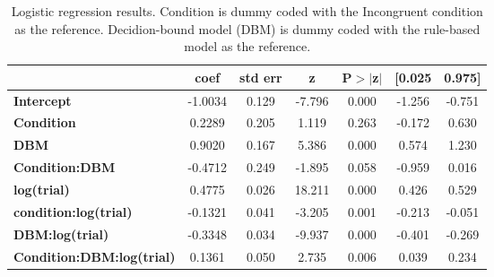 \documentclass[doc, floatsintext]{apa7}
\begin{document}
\begin{table}
\begin{center}
\caption{Logistic regression results. Condition is dummy
    coded with the Incongruent condition as the reference.
    Decidion-bound model (DBM) is dummy coded with the
    rule-based model as the reference.
}
\label{tab_logistic_regression}
\begin{tabular}{lcccccc}
  & \textbf{coef} & \textbf{std err} & \textbf{z} & \textbf{P$> |$z$|$} & \textbf{[0.025} & \textbf{0.975]}  \\
\midrule
\textbf{Intercept}                            &      -1.0034  &        0.129     &    -7.796  &         0.000        &       -1.256    &       -0.751     \\
\textbf{Condition}                            &       0.2289  &        0.205     &     1.119  &         0.263        &       -0.172    &        0.630     \\
\textbf{DBM}                                  &       0.9020  &        0.167     &     5.386  &         0.000        &        0.574    &        1.230     \\
\textbf{Condition:DBM}                        &      -0.4712  &        0.249     &    -1.895  &         0.058        &       -0.959    &        0.016     \\
\textbf{log(trial)}                           &       0.4775  &        0.026     &    18.211  &         0.000        &        0.426    &        0.529     \\
\textbf{condition:log(trial)}                 &      -0.1321  &        0.041     &    -3.205  &         0.001        &       -0.213    &       -0.051     \\
\textbf{DBM:log(trial)}                       &      -0.3348  &        0.034     &    -9.937  &         0.000        &       -0.401    &       -0.269     \\
\textbf{Condition:DBM:log(trial)}             &       0.1361  &        0.050     &     2.735  &         0.006        &        0.039    &        0.234     \\
\bottomrule
\end{tabular}
\end{center}
\end{table}
\end{document}
